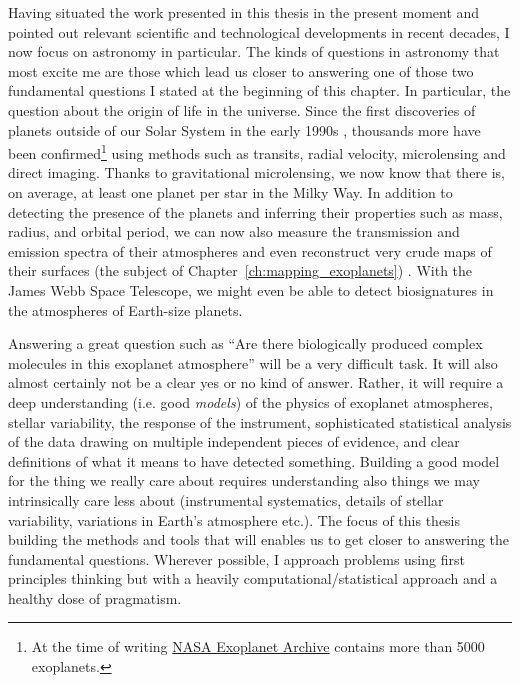 \documentclass[12pt,dvipsnames]{report}
\begin{document}
Having situated the work presented in this thesis in the present moment and pointed
out relevant scientific and technological developments in recent decades, I now focus on astronomy 
in particular. The kinds of questions in astronomy that
most excite me are those which lead us closer to answering one of those two
fundamental questions I stated at the beginning of this chapter. In particular,
the question about the origin of life in the universe. Since the first discoveries of 
planets outside of our Solar System in the early 1990s
\citep{1992Natur.355..145W,1995Natur.378..355M}, thousands more have been
confirmed\footnote{At the time of writing 
    \href{https://exoplanetarchive.ipac.caltech.edu/}{NASA Exoplanet Archive}
    contains more than 5000 exoplanets.} using methods such as transits, radial
velocity, microlensing and direct imaging. Thanks to gravitational microlensing,
we now know \citep{2012Natur.481..167C} that there is, on average, at least one planet per
star in the Milky Way. In addition to detecting the presence of the planets and
inferring their properties such as mass, radius, and orbital period, 
we can now also measure the transmission and emission spectra of their atmospheres
and even reconstruct very crude maps of their surfaces (the subject of
    Chapter~\ref{ch:mapping_exoplanets})
\citep{2007Natur.447..183K,2012ApJ...747L..20M}. With the James Webb Space
Telescope, we might even be able to detect biosignatures in the atmospheres of
Earth-size planets.

Answering a great question such as ``Are there biologically produced complex
molecules in this exoplanet atmosphere'' will be a very difficult task. 
It will also almost certainly not be a clear yes or no kind of answer. Rather, it will
require a deep understanding (i.e. good \emph{models}) of the physics of
exoplanet atmospheres, stellar variability, the response of the instrument,
sophisticated statistical analysis of the data drawing on multiple independent
pieces of evidence, and clear definitions of what it means to have detected
something. Building a good model for the thing we really care about requires
understanding also things we may intrinsically care less about
(instrumental systematics, details of stellar variability, variations in
Earth's atmosphere etc.).
The focus of this thesis building the methods and tools that will enables us to 
get closer to answering the fundamental questions.
Wherever possible, I approach problems using first principles thinking 
but with a heavily computational/statistical approach and a healthy dose of pragmatism. 
\end{document}
